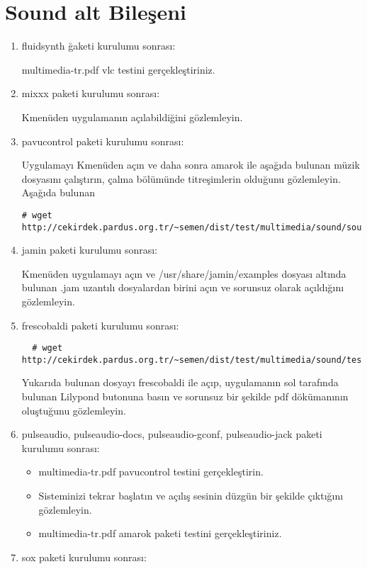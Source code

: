 \documentclass[a4paper,10pt]{article}
\begin{document}
\section{Sound alt Bileşeni}
\begin{enumerate}

\item fluidsynth ğaketi kurulumu sonrası:

multimedia-tr.pdf vlc testini gerçekleştiriniz.

\item mixxx paketi kurulumu sonrası:

Kmenüden uygulamanın açılabildiğini gözlemleyin.
\item pavucontrol paketi kurulumu sonrası:

Uygulamayı Kmenüden açın ve daha sonra amarok ile aşağıda bulunan müzik dosyasını çalıştırın, çalma bölümünde titreşimlerin olduğunu gözlemleyin.
Aşağıda bulunan
\begin{verbatim}
# wget http://cekirdek.pardus.org.tr/~semen/dist/test/multimedia/sound/sound/sample.mp3
\end{verbatim}

\item jamin paketi kurulumu sonrası:

Kmenüden uygulamayı açın ve /usr/share/jamin/examples dosyası altında bulunan .jam uzantılı dosyalardan birini açın ve sorunsuz olarak açıldığını gözlemleyin.
\item frescobaldi paketi kurulumu sonrası:
 \begin{verbatim}
  # wget http://cekirdek.pardus.org.tr/~semen/dist/test/multimedia/sound/test_frescobaldi.ly
 \end{verbatim}
Yukarıda bulunan dosyayı frescobaldi ile açıp, uygulamanın sol tarafında bulunan Lilypond butonuna basın ve sorunsuz bir şekilde pdf dökümanının oluştuğunu gözlemleyin.
\item pulseaudio, pulseaudio-docs, pulseaudio-gconf, pulseaudio-jack paketi kurulumu sonrası:
\begin{itemize}
 \item multimedia-tr.pdf pavucontrol testini gerçekleştirin.
 \item Sisteminizi tekrar başlatın ve açılış sesinin düzgün bir şekilde çıktığını gözlemleyin. 
 \item multimedia-tr.pdf amarok paketi testini gerçekleştiriniz.
\end{itemize}
\item sox paketi kurulumu sonrası:


\end{enumerate}
\end{document}
